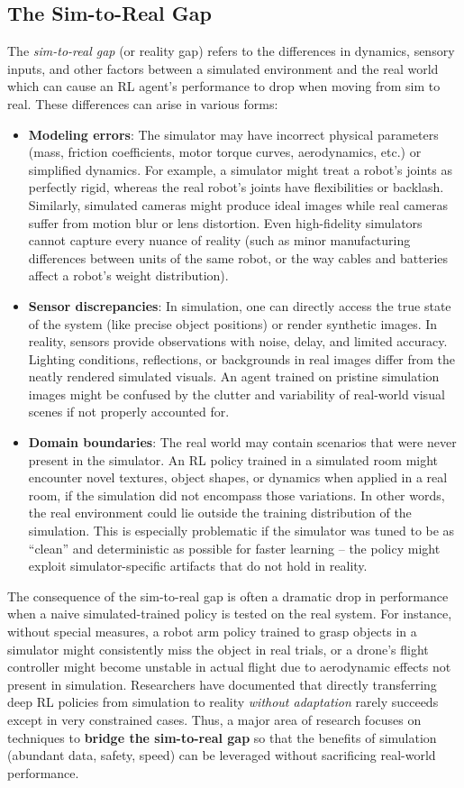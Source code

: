 \subsection{The Sim-to-Real Gap}
The \textit{sim-to-real gap} (or reality gap) refers to the differences in dynamics, sensory inputs, and other factors between a simulated environment and the real world which can cause an RL agent's performance to drop when moving from sim to real. These differences can arise in various forms:
\begin{itemize}
    \item \textbf{Modeling errors}: The simulator may have incorrect physical parameters (mass, friction coefficients, motor torque curves, aerodynamics, etc.) or simplified dynamics. For example, a simulator might treat a robot's joints as perfectly rigid, whereas the real robot's joints have flexibilities or backlash. Similarly, simulated cameras might produce ideal images while real cameras suffer from motion blur or lens distortion. Even high-fidelity simulators cannot capture every nuance of reality (such as minor manufacturing differences between units of the same robot, or the way cables and batteries affect a robot’s weight distribution).
    \item \textbf{Sensor discrepancies}: In simulation, one can directly access the true state of the system (like precise object positions) or render synthetic images. In reality, sensors provide observations with noise, delay, and limited accuracy. Lighting conditions, reflections, or backgrounds in real images differ from the neatly rendered simulated visuals. An agent trained on pristine simulation images might be confused by the clutter and variability of real-world visual scenes if not properly accounted for.
    \item \textbf{Domain boundaries}: The real world may contain scenarios that were never present in the simulator. An RL policy trained in a simulated room might encounter novel textures, object shapes, or dynamics when applied in a real room, if the simulation did not encompass those variations. In other words, the real environment could lie outside the training distribution of the simulation. This is especially problematic if the simulator was tuned to be as “clean” and deterministic as possible for faster learning – the policy might exploit simulator-specific artifacts that do not hold in reality.
\end{itemize}
The consequence of the sim-to-real gap is often a dramatic drop in performance when a naive simulated-trained policy is tested on the real system. For instance, without special measures, a robot arm policy trained to grasp objects in a simulator might consistently miss the object in real trials,
or a drone’s flight controller might become unstable in actual flight due to aerodynamic effects not present in simulation. Researchers have documented that directly transferring deep RL policies from simulation to reality \textit{without adaptation} rarely succeeds except in very constrained cases. Thus, a major area of research focuses on techniques to \textbf{bridge the sim-to-real gap} so that the benefits of simulation (abundant data, safety, speed) can be leveraged without sacrificing real-world performance.

